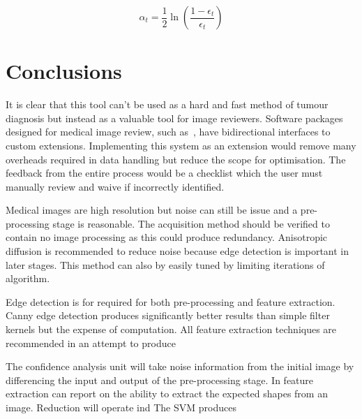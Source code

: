 \documentclass[journal]{IEEEtran}
\begin{document}
\begin{equation}
	\alpha_t = \frac{1}{2}\ln\left(\frac{1 - \epsilon_t}{\epsilon_t}\right)
	\label{eqn:adaboost}
\end{equation}






\section{Conclusions}
\label{sec:conclusions}

It is clear that this tool can't be used as a hard and fast method of tumour diagnosis but instead as a valuable tool for image reviewers.
Software packages designed for medical image review, such as~\cite{slicer}, have bidirectional interfaces to custom extensions.
Implementing this system as an extension would remove many overheads required in data handling but reduce the scope for optimisation.
The feedback from the entire process would be a checklist which the user must manually review and waive if incorrectly identified.

Medical images are high resolution but noise can still be issue and a pre-processing stage is reasonable.
The acquisition method should be verified to contain no image processing as this could produce redundancy.
Anisotropic diffusion is recommended to reduce noise because edge detection is important in later stages.
This method can also by easily tuned by limiting iterations of algorithm.

Edge detection is for required for both pre-processing and feature extraction.
Canny edge detection produces significantly better results than simple filter kernels but the expense of computation.
All feature extraction techniques are recommended in an attempt to produce 

The confidence analysis unit will take noise information from the initial image by differencing the input and output of the pre-processing stage.
In feature extraction can report on the ability to extract the expected shapes from an image. 
Reduction will operate ind
The SVM produces









\end{document}
